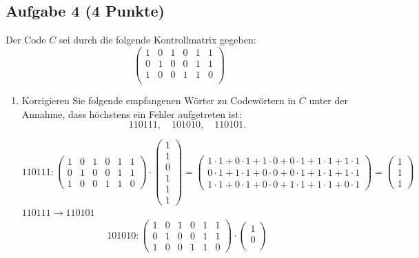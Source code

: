 \documentclass{article} %
\begin{document}
\subsection*{Aufgabe 4 (4 Punkte)}
Der Code $C$ sei durch die folgende Kontrollmatrix gegeben:
\[
\begin{pmatrix}
1 & 0 & 1 & 0 & 1 & 1 \\
0 & 1 & 0 & 0 & 1 & 1 \\
1 & 0 & 0 & 1 & 1 & 0 \\
\end{pmatrix}
\]
\begin{enumerate}
    \item[(a)] Korrigieren Sie folgende empfangenen Wörter zu Codewörtern in $C$ unter der Annahme, dass höchstens ein Fehler aufgetreten ist:
    \[
    110111, \quad 101010, \quad 110101.
    \]
    \begin{mybox}
    \[
    110111: 
\begin{pmatrix} 
1 & 0 & 1 & 0 & 1 & 1 \\
0 & 1 & 0 & 0 & 1 & 1 \\
1 & 0 & 0 & 1 & 1 & 0
\end{pmatrix} 
\cdot 
\begin{pmatrix} 
1 \\
1 \\
0 \\
1 \\
1 \\
1
\end{pmatrix}
= \begin{pmatrix}
1 \cdot 1 + 0 \cdot 1 + 1 \cdot 0 + 0 \cdot 1 + 1 \cdot 1 + 1 \cdot 1 \\
0 \cdot 1 + 1 \cdot 1 + 0 \cdot 0 + 0 \cdot 1 + 1 \cdot 1 + 1 \cdot 1 \\
1 \cdot 1 + 0 \cdot 1 + 0 \cdot 0 + 1 \cdot 1 + 1 \cdot 1 + 0 \cdot 1
\end{pmatrix}
= \begin{pmatrix}
1 \\
1 \\
1
\end{pmatrix}
\]
$ 110111 \rightarrow 110101$
\[
101010: 
\begin{pmatrix} 
1 & 0 & 1 & 0 & 1 & 1 \\
0 & 1 & 0 & 0 & 1 & 1 \\
1 & 0 & 0 & 1 & 1 & 0
\end{pmatrix}
\cdot 
\begin{pmatrix} 
1 \\
0 \\

\end{pmatrix}\]
\end{mybox}
\end{enumerate}
\end{document}
